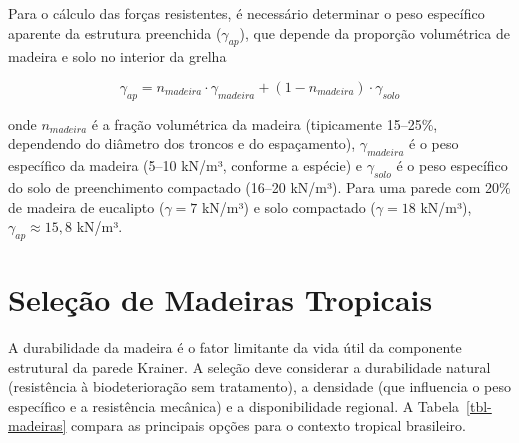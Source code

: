 \documentclass[
  portuguese,
  11pt,
  a4paper,
  open=any]{scrbook}
\begin{document}
Para o cálculo das forças resistentes, é necessário determinar o peso
específico aparente da estrutura preenchida (\(\gamma_{ap}\)), que
depende da proporção volumétrica de madeira e solo no interior da grelha

\[
\gamma_{ap} = n_{madeira} \cdot \gamma_{madeira} + (1 - n_{madeira}) \cdot \gamma_{solo}
\]

onde \(n_{madeira}\) é a fração volumétrica da madeira (tipicamente
15--25\%, dependendo do diâmetro dos troncos e do espaçamento),
\(\gamma_{madeira}\) é o peso específico da madeira (5--10 kN/m³,
conforme a espécie) e \(\gamma_{solo}\) é o peso específico do solo de
preenchimento compactado (16--20 kN/m³). Para uma parede com 20\% de
madeira de eucalipto (\(\gamma = 7\) kN/m³) e solo compactado
(\(\gamma = 18\) kN/m³), \(\gamma_{ap} \approx 15{,}8\) kN/m³.

\section{Seleção de Madeiras
Tropicais}\label{seleuxe7uxe3o-de-madeiras-tropicais}

A durabilidade da madeira é o fator limitante da vida útil da componente
estrutural da parede Krainer. A seleção deve considerar a durabilidade
natural (resistência à biodeterioração sem tratamento), a densidade (que
influencia o peso específico e a resistência mecânica) e a
disponibilidade regional. A Tabela~\ref{tbl-madeiras} compara as
principais opções para o contexto tropical brasileiro.
\end{document}
